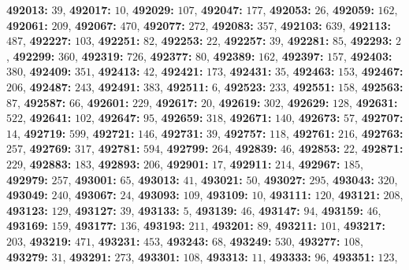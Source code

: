 \textsf{\bfseries 492013:} $39$, \textsf{\bfseries 492017:} $10$, \textsf{\bfseries 492029:} $107$, \textsf{\bfseries 492047:} $177$, \textsf{\bfseries 492053:} $26$, \textsf{\bfseries 492059:} $162$, \textsf{\bfseries 492061:} $209$, \textsf{\bfseries 492067:} $470$, \textsf{\bfseries 492077:} $272$, \textsf{\bfseries 492083:} $357$, \textsf{\bfseries 492103:} $639$, \textsf{\bfseries 492113:} $487$, \textsf{\bfseries 492227:} $103$, \textsf{\bfseries 492251:} $82$, \textsf{\bfseries 492253:} $22$, \textsf{\bfseries 492257:} $39$, \textsf{\bfseries 492281:} $85$, \textsf{\bfseries 492293:} $2$, \textsf{\bfseries 492299:} $360$, \textsf{\bfseries 492319:} $726$, \textsf{\bfseries 492377:} $80$, \textsf{\bfseries 492389:} $162$, \textsf{\bfseries 492397:} $157$, \textsf{\bfseries 492403:} $380$, \textsf{\bfseries 492409:} $351$, \textsf{\bfseries 492413:} $42$, \textsf{\bfseries 492421:} $173$, \textsf{\bfseries 492431:} $35$, \textsf{\bfseries 492463:} $153$, \textsf{\bfseries 492467:} $206$, \textsf{\bfseries 492487:} $243$, \textsf{\bfseries 492491:} $383$, \textsf{\bfseries 492511:} $6$, \textsf{\bfseries 492523:} $233$, \textsf{\bfseries 492551:} $158$, \textsf{\bfseries 492563:} $87$, \textsf{\bfseries 492587:} $66$, \textsf{\bfseries 492601:} $229$, \textsf{\bfseries 492617:} $20$, \textsf{\bfseries 492619:} $302$, \textsf{\bfseries 492629:} $128$, \textsf{\bfseries 492631:} $522$, \textsf{\bfseries 492641:} $102$, \textsf{\bfseries 492647:} $95$, \textsf{\bfseries 492659:} $318$, \textsf{\bfseries 492671:} $140$, \textsf{\bfseries 492673:} $57$, \textsf{\bfseries 492707:} $14$, \textsf{\bfseries 492719:} $599$, \textsf{\bfseries 492721:} $146$, \textsf{\bfseries 492731:} $39$, \textsf{\bfseries 492757:} $118$, \textsf{\bfseries 492761:} $216$, \textsf{\bfseries 492763:} $257$, \textsf{\bfseries 492769:} $317$, \textsf{\bfseries 492781:} $594$, \textsf{\bfseries 492799:} $264$, \textsf{\bfseries 492839:} $46$, \textsf{\bfseries 492853:} $22$, \textsf{\bfseries 492871:} $229$, \textsf{\bfseries 492883:} $183$, \textsf{\bfseries 492893:} $206$, \textsf{\bfseries 492901:} $17$, \textsf{\bfseries 492911:} $214$, \textsf{\bfseries 492967:} $185$, \textsf{\bfseries 492979:} $257$, \textsf{\bfseries 493001:} $65$, \textsf{\bfseries 493013:} $41$, \textsf{\bfseries 493021:} $50$, \textsf{\bfseries 493027:} $295$, \textsf{\bfseries 493043:} $320$, \textsf{\bfseries 493049:} $240$, \textsf{\bfseries 493067:} $24$, \textsf{\bfseries 493093:} $109$, \textsf{\bfseries 493109:} $10$, \textsf{\bfseries 493111:} $120$, \textsf{\bfseries 493121:} $208$, \textsf{\bfseries 493123:} $129$, \textsf{\bfseries 493127:} $39$, \textsf{\bfseries 493133:} $5$, \textsf{\bfseries 493139:} $46$, \textsf{\bfseries 493147:} $94$, \textsf{\bfseries 493159:} $46$, \textsf{\bfseries 493169:} $159$, \textsf{\bfseries 493177:} $136$, \textsf{\bfseries 493193:} $211$, \textsf{\bfseries 493201:} $89$, \textsf{\bfseries 493211:} $101$, \textsf{\bfseries 493217:} $203$, \textsf{\bfseries 493219:} $471$, \textsf{\bfseries 493231:} $453$, \textsf{\bfseries 493243:} $68$, \textsf{\bfseries 493249:} $530$, \textsf{\bfseries 493277:} $108$, \textsf{\bfseries 493279:} $31$, \textsf{\bfseries 493291:} $273$, \textsf{\bfseries 493301:} $108$, \textsf{\bfseries 493313:} $11$, \textsf{\bfseries 493333:} $96$, \textsf{\bfseries 493351:} $123$, 
